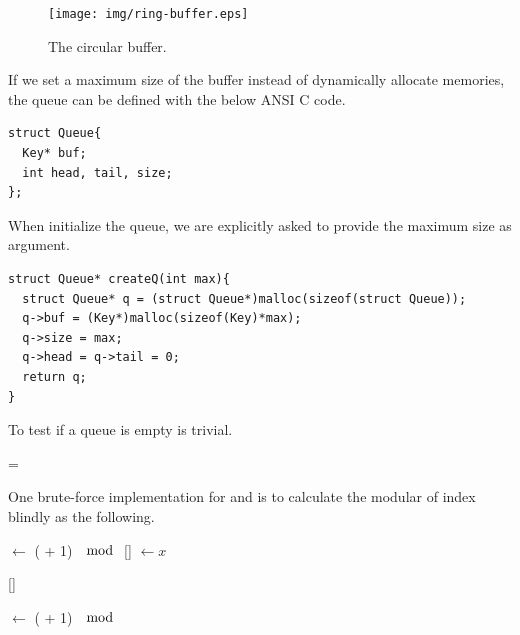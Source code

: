 \documentclass{article}
\begin{document}
\begin{figure}[htbp]
 \centering
 \texttt{[image: img/ring-buffer.eps]}
 \caption{The circular buffer.} \label{fig:circular-buffer}
\end{figure}

If we set a maximum size of the buffer instead of dynamically allocate 
memories, the queue can be defined with the below ANSI C code.

\lstset{language=C}
\begin{lstlisting}
struct Queue{
  Key* buf;
  int head, tail, size;
};
\end{lstlisting}

When initialize the queue, we are explicitly asked to provide the maximum
size as argument.

\begin{lstlisting}
struct Queue* createQ(int max){
  struct Queue* q = (struct Queue*)malloc(sizeof(struct Queue));
  q->buf = (Key*)malloc(sizeof(Key)*max);
  q->size = max;
  q->head = q->tail = 0;
  return q;
}
\end{lstlisting}

To test if a queue is empty is trivial.

\begin{algorithmic}
  \State \Return {} = 
\EndFunction
\end{algorithmic}

One brute-force implementation for  and 
is to calculate the modular of index blindly as the following.

\begin{algorithmic}
    \State {} $\gets $ ( + 1) $\mod$ 
    \State {}[] $\gets x$
  \EndIf
\EndFunction
\end{algorithmic}

\begin{algorithmic}
    \State \Return {}[]
  \EndIf
\EndFunction
\end{algorithmic}

\begin{algorithmic}
    \State {} $\gets $ ( + 1) $\mod$ 
  \EndIf
\EndFunction
\end{algorithmic}
\end{document}
